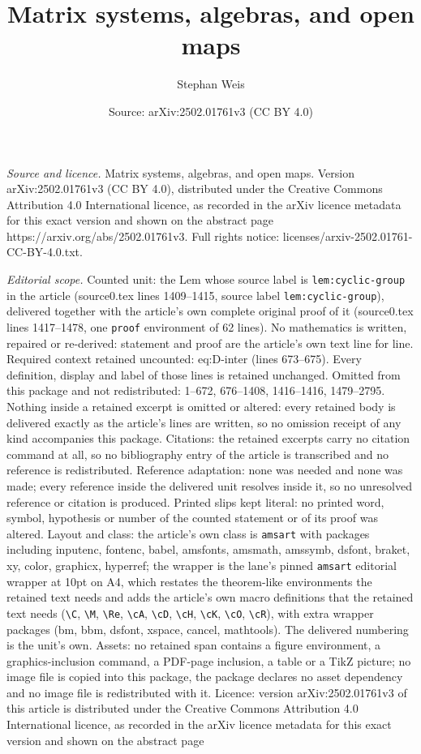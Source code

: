 \documentclass[10pt,a4paper]{amsart}
\title[Matrix systems, algebras, and open maps]{Matrix systems, algebras, and open maps}
\author{Stephan Weis}
\date{Source: arXiv:2502.01761v3 (CC BY 4.0)}
\begin{document}
\maketitle

\noindent\emph{Source and licence.} Matrix systems, algebras, and open maps. Version arXiv:2502.01761v3 (CC BY 4.0), distributed under the Creative Commons Attribution 4.0 International licence, as recorded in the arXiv licence metadata for this exact version and shown on the abstract page https://arxiv.org/abs/2502.01761v3. Full rights notice: licenses/arxiv-2502.01761-CC-BY-4.0.txt.\par\smallskip

\noindent\textit{Editorial scope.} Counted unit: the Lem whose source label is \texttt{lem:cyclic-group} in the article (source0.tex lines 1409--1415, source label \texttt{lem:cyclic-group}), delivered together with the article's own complete original proof of it (source0.tex lines 1417--1478, one \texttt{proof} environment of 62 lines). No mathematics is written, repaired or re-derived: statement and proof are the article's own text line for line. Required context retained uncounted: eq:D-inter (lines 673--675). Every definition, display and label of those lines is retained unchanged. Omitted from this package and not redistributed: 1--672, 676--1408, 1416--1416, 1479--2795. Nothing inside a retained excerpt is omitted or altered: every retained body is delivered exactly as the article's lines are written, so no omission receipt of any kind accompanies this package. Citations: the retained excerpts carry no citation command at all, so no bibliography entry of the article is transcribed and no reference is redistributed. Reference adaptation: none was needed and none was made; every reference inside the delivered unit resolves inside it, so no unresolved reference or citation is produced. Printed slips kept literal: no printed word, symbol, hypothesis or number of the counted statement or of its proof was altered. Layout and class: the article's own class is \texttt{amsart} with packages including inputenc, fontenc, babel, amsfonts, amsmath, amssymb, dsfont, braket, xy, color, graphicx, hyperref; the wrapper is the lane's pinned \texttt{amsart} editorial wrapper at 10pt on A4, which restates the theorem-like environments the retained text needs and adds the article's own macro definitions that the retained text needs (\texttt{\textbackslash C}, \texttt{\textbackslash M}, \texttt{\textbackslash Re}, \texttt{\textbackslash cA}, \texttt{\textbackslash cD}, \texttt{\textbackslash cH}, \texttt{\textbackslash cK}, \texttt{\textbackslash cO}, \texttt{\textbackslash cR}), with extra wrapper packages (bm, bbm, dsfont, xspace, cancel, mathtools). The delivered numbering is the unit's own. Assets: no retained span contains a figure environment, a graphics-inclusion command, a PDF-page inclusion, a table or a TikZ picture; no image file is copied into this package, the package declares no asset dependency and no image file is redistributed with it. Licence: version arXiv:2502.01761v3 of this article is distributed under the Creative Commons Attribution 4.0 International licence, as recorded in the arXiv licence metadata for this exact version and shown on the abstract page 
\end{document}
